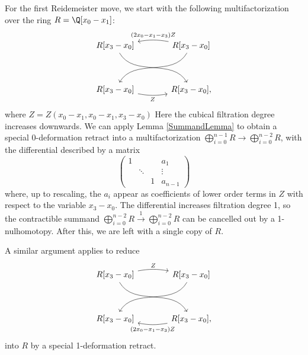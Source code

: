 For the first Reidemeister move, we start with the following multifactorization over the ring $R=\Q[x_0-x_1]$:
$$\begin{tikzcd}[column sep=large, ]
	R[x_3-x_0]\ar[ddr, out=-60, in=120]&R[x_3-x_0] \ar[l,"(2x_0-x_1-x_3)Z", bend right=10, swap]\arrow[ddl, out=-120, in=60] \\\\
	R[x_3-x_0]\ar[r,"Z", bend right=10, swap]&R[x_3-x_0],
\end{tikzcd}$$
where $Z=Z(x_0-x_1,x_0-x_1,x_3-x_0)$
Here the cubical filtration degree increases downwards. We can apply Lemma \ref{SummandLemma} to obtain a special 0-deformation retract into a multifactorization
$\bigoplus_{i=0}^{n-1} R \to \bigoplus_{i=0}^{n-2}R$, with the differential described by a matrix
$$\left(\begin{array}{cccc} 1  &&&a_1\\&\ddots&&\vdots \\&&1&a_{n-1}
\end{array}\right)$$
where, up to rescaling, the $a_i$ appear as coefficients of lower order terms in $Z$ with respect to the variable $x_3-x_0$. The differential increases filtration degree 1, so the contractible summand $\bigoplus_{i=0}^{n-2} R \xrightarrow{1} \bigoplus_{i=0}^{n-2}R$ can be cancelled out by a 1-nulhomotopy. After this, we are left with a single copy of $R$.


A similar argument applies to reduce
$$\begin{tikzcd}[column sep=large, ]
	R[x_3-x_0]\ar[ddr, out=-60, in=120]\ar[r,"Z", bend left=10]&R[x_3-x_0] \arrow[ddl, out=-120, in=60] \\\\
	R[x_3-x_0]&R[x_3-x_0]\ar[l,"(2x_0-x_1-x_3)Z", bend left=10],
\end{tikzcd}$$
into $R$ by a special 1-deformation retract.
